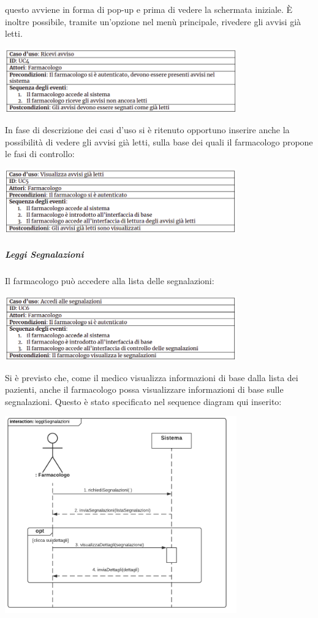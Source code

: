 \documentclass{article}
\begin{document}
questo avviene in forma di pop-up e prima di vedere la schermata iniziale. È inoltre possibile, tramite un'opzione nel menù principale, rivedere gli avvisi già letti.
\begin{center}
    \includegraphics[width=0.75\textwidth]{pictures/UC4.png}
\end{center}
In fase di descrizione dei casi d'uso si è ritenuto opportuno inserire anche la possibilità di vedere gli avvisi già letti, sulla base dei quali il farmacologo propone le fasi di controllo:
\begin{center}
    \includegraphics[width=0.75\textwidth]{pictures/UC5.png}
\end{center}
\subparagraph*{Leggi Segnalazioni}
Il farmacologo può accedere alla lista delle segnalazioni:
\begin{center}
    \includegraphics[width=0.75\textwidth]{pictures/UC6.png}
\end{center}
Si è previsto che, come il medico visualizza informazioni di base dalla lista dei pazienti, anche il farmacologo possa visualizzare informazioni di base sulle segnalazioni. Questo è stato specificato nel sequence diagram qui inserito:
\begin{center}
    \includegraphics[width=0.75\textwidth]{pictures/SDFarmacologo1_Segnalazioni.png}
\end{center}
\end{document}
